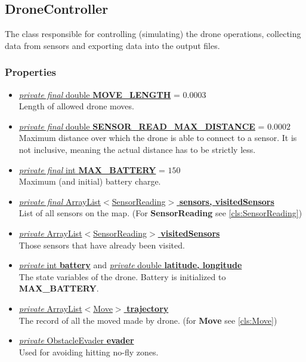 \documentclass{article}
\newcommand{\prop}[3]{\underline{\textit{#1} #2 \textbf{#3}}}
\begin{document}
\subsection{DroneController}
\label{cls:DroneController}

The class responsible for controlling (simulating) the drone operations, collecting data from sensors and exporting data into the output files.

\subsubsection*{Properties}

\begin{itemize}
\item \prop{private final}{double}{MOVE\_LENGTH} = $0.0003$ \\
  Length of allowed drone moves.
\item \prop{private final}{double}{SENSOR\_READ\_MAX\_DISTANCE} = $0.0002$ \\
  Maximum distance over which the drone is able to connect to a sensor. It is not inclusive, meaning the actual distance has to be strictly less.
\item \prop{private final}{int}{MAX\_BATTERY} = $150$ \\
  Maximum (and initial) battery charge.
\\
\item \prop{private final}{ArrayList$<$SensorReading$>$}{sensors, visitedSensors} \\
  List of all sensors on the map. (For \textbf{SensorReading} see \ref{cls:SensorReading})
\item \prop{private}{ArrayList$<$SensorReading$>$}{visitedSensors} \\
  Those sensors that have already been visited.
\item \prop{private}{int}{battery} and \prop{private}{double}{latitude, longitude} \\
  The state variables of the drone. Battery is initialized to \textbf{MAX\_BATTERY}.
\item \prop{private}{ArrayList$<$Move$>$}{trajectory} \\
  The record of all the moved made by drone. (for \textbf{Move} see \ref{cls:Move})
\item \prop{private}{ObstacleEvader}{evader} \\
  Used for avoiding hitting no-fly zones.
\end{itemize}
\end{document}
